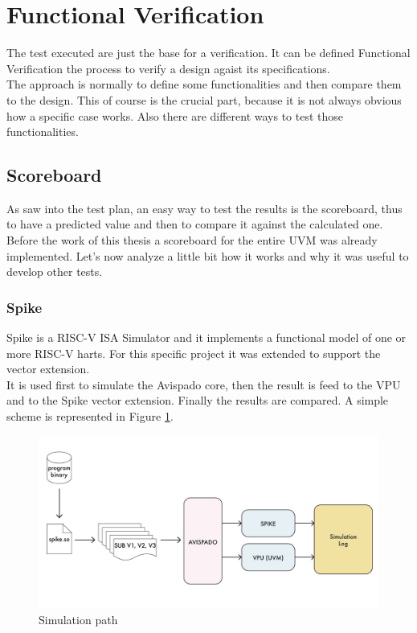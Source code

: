 \section{Functional Verification}
The test executed are just the base for a verification. It can be defined Functional Verification the process to verify a design agaist its specifications.\\

The approach is normally to define some functionalities and then compare them to the design. This of course is the crucial part, because it is not always obvious how a specific case works. Also there are different ways to test those functionalities.\\

\subsection{Scoreboard}
As saw into the test plan, an easy way to test the results is the scoreboard, thus to have a predicted value and then to compare it against the calculated one.\\

Before the work of this thesis a scoreboard for the entire UVM was already implemented. Let's now analyze a little bit how it works and why it was useful to develop other tests.

\subsubsection{Spike}
Spike is a RISC-V ISA Simulator and it implements a functional model of one or more RISC-V harts. For this specific project it was extended to support the vector extension.\\
It is used first to simulate the Avispado core, then the result is feed to the VPU and to the Spike vector extension. Finally the results are compared. A simple scheme is represented in Figure \ref{bin-to-log}. \\

\begin{figure}[H]
    \centering
    \includegraphics[scale = 0.5]{Chapter_2/img/bin-to-log.png}
    \caption{Simulation path}
    \label{bin-to-log}
\end{figure}

